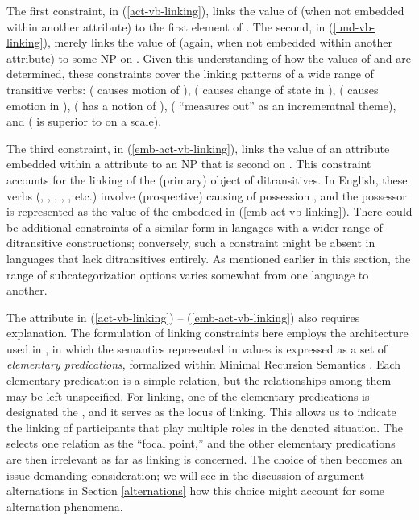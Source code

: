 \documentclass[output=paper]{langsci/langscibook}
\begin{document}
\noindent
The first constraint, in (\ref{act-vb-linking}), links the value of  (when not embedded within another attribute) to the first element of \argst.
The second, in (\ref{und-vb-linking}), merely links the value of  (again, when not embedded within another attribute) to some NP on \argst.
Given this understanding of how the values of  and  are determined, these constraints cover the linking patterns of a wide range of transitive verbs:  ( causes motion of ),  ( causes change of state in ),  ( causes emotion in ),  ( has a notion of ),  ( ``measures out''  as an incrememtnal theme), and  ( is superior to  on a scale).

The third constraint, in (\ref{emb-act-vb-linking}), links the value of an  attribute embedded within a  attribute to an NP that is second on \argst.
This constraint accounts for the linking of the (primary) object of ditransitives.
In English, these verbs (, , , , , etc.) involve (prospective) causing of possession \citep{Pinker1989,Goldberg95a}, and the possessor is represented as the value of the embedded  in (\ref{emb-act-vb-linking}).
There could be additional constraints of a similar form in langages with a wider range of ditransitive constructions; conversely, such a constraint might be absent in languages that lack ditransitives entirely.
As mentioned earlier in this section, the range of subcategorization options varies somewhat from one language to another.

The  attribute in (\ref{act-vb-linking}) -- (\ref{emb-act-vb-linking}) also requires explanation.
The formulation of linking constraints here employs the architecture used in \citet{KoenigandDavis2006}, in which the semantics represented in \content values is expressed as a set of \emph{elementary predications}, formalized within Minimal Recursion Semantics \citep{Copestakeetal2001,Copestakeetal2005}.
Each elementary predication is a simple relation, but the relationships among them may be left unspecified.
For linking, one of the elementary predications is designated the , and it serves as the locus of linking.
This allows us to %
indicate the linking of participants that play multiple roles in the denoted situation. 
The  selects one relation as the ``focal point,'' and the other elementary predications are then irrelevant as far as linking is concerned. 
The choice of  then becomes an issue demanding consideration; we will see in the discussion of argument alternations in Section \ref{alternations} how this choice might account for some alternation phenomena.
\end{document}

